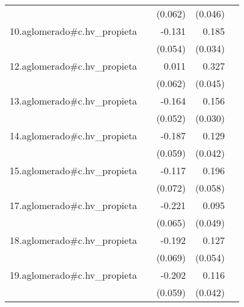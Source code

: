 {\begin{longtable}{l*{4}{D{.}{.}{-1}}}
            &                     &     (0.062)         &     (0.046)         &                     \\
\addlinespace
10.aglomerado#c.hv\_propieta&                     &      -0.131\sym{*}  &       0.185\sym{***}&                     \\
            &                     &     (0.054)         &     (0.034)         &                     \\
\addlinespace
12.aglomerado#c.hv\_propieta&                     &       0.011         &       0.327\sym{***}&                     \\
            &                     &     (0.062)         &     (0.045)         &                     \\
\addlinespace
13.aglomerado#c.hv\_propieta&                     &      -0.164\sym{**} &       0.156\sym{***}&                     \\
            &                     &     (0.052)         &     (0.030)         &                     \\
\addlinespace
14.aglomerado#c.hv\_propieta&                     &      -0.187\sym{**} &       0.129\sym{**} &                     \\
            &                     &     (0.059)         &     (0.042)         &                     \\
\addlinespace
15.aglomerado#c.hv\_propieta&                     &      -0.117         &       0.196\sym{***}&                     \\
            &                     &     (0.072)         &     (0.058)         &                     \\
\addlinespace
17.aglomerado#c.hv\_propieta&                     &      -0.221\sym{***}&       0.095         &                     \\
            &                     &     (0.065)         &     (0.049)         &                     \\
\addlinespace
18.aglomerado#c.hv\_propieta&                     &      -0.192\sym{**} &       0.127\sym{*}  &                     \\
            &                     &     (0.069)         &     (0.054)         &                     \\
\addlinespace
19.aglomerado#c.hv\_propieta&                     &      -0.202\sym{***}&       0.116\sym{**} &                     \\
            &                     &     (0.059)         &     (0.042)         &                     \\

\end{longtable}}
